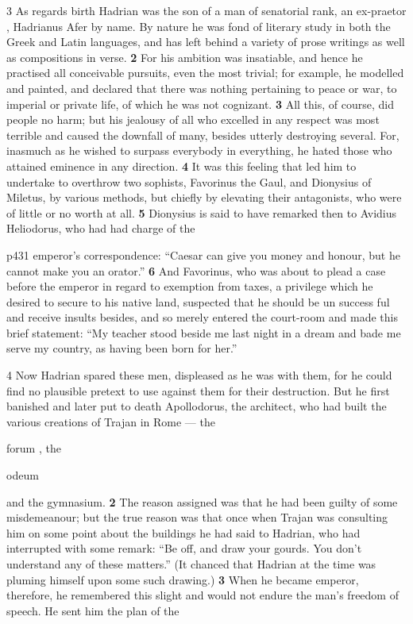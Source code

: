 3 As regards birth Hadrian was the son of a man of senatorial rank, an ex-praetor , Hadrianus Afer by name. By nature he was fond of literary study in both the Greek and Latin languages, and has left behind a variety of prose writings as well as compositions in verse. \textbf{2} For his ambition was insatiable, and hence he practised all conceivable pursuits, even the most trivial; for example, he modelled and painted, and declared that there was nothing pertaining to peace or war, to imperial or private life, of which he was not cognizant. \textbf{3} All this, of course, did people no harm; but his jealousy of all who excelled in any respect was most terrible and caused the downfall of many, besides utterly destroying several. For, inasmuch as he wished to surpass everybody in everything, he hated those who attained eminence in any direction. \textbf{4} It was this feeling that led him to undertake to overthrow two sophists, Favorinus the Gaul, and Dionysius of Miletus, by various methods, but chiefly by elevating their antagonists, who were of little or no worth at all. \textbf{5} Dionysius is said to have remarked then to Avidius Heliodorus, who had had charge of the

p431 emperor's correspondence: ``Caesar can give you money and honour, but he cannot make you an orator.'' \textbf{6} And Favorinus, who was about to plead a case before the emperor in regard to exemption from taxes, a privilege which he desired to secure to his native land, suspected that he should be un­ success ­ful and receive insults besides, and so merely entered the court-room and made this brief statement: ``My teacher stood beside me last night in a dream and bade me serve my country, as having been born for her.''

4 Now Hadrian spared these men, displeased as he was with them, for he could find no plausible pretext to use against them for their destruction. But he first banished and later put to death Apollodorus, the architect, who had built the various creations of Trajan in Rome \texthebrew{—} the

forum , the

odeum

and the gymnasium. \textbf{2} The reason assigned was that he had been guilty of some misdemeanour; but the true reason was that once when Trajan was consulting him on some point about the buildings he had said to Hadrian, who had interrupted with some remark: ``Be off, and draw your gourds. You don't understand any of these matters.'' (It chanced that Hadrian at the time was pluming himself upon some such drawing.) \textbf{3} When he became emperor, therefore, he remembered this slight and would not endure the man's freedom of speech. He sent him the plan of the

